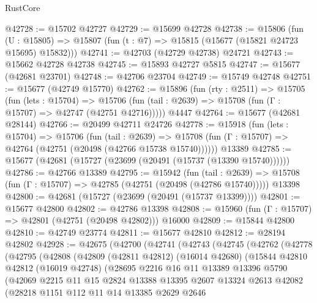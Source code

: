 \begin{lexlean}{RustCore}
\begin{coremodule}
@42728 := @15702 @42727
@42729 := @15699 @42728
@42738 := @15806
    (fun (U : @15805) => @15807 (fun (t : @7) => @15815 (@15677 (@15821 @24723 @15695) @15832)))
@42741 := @42703 (@42729 @42738) @24721
@42743 := @15662 @42728 @42738
@42745 := @15893 @42727 @5815
@42747 := @15677 (@42681 @23701)
@42748 := @42706 @23704
@42749 := @15749 @42748
@42751 := @15677 (@42749 @15770)
@42762 := @15896
    (fun (rty : @2511) =>
    @15705
      (fun (lets : @15704) =>
      @15706 (fun (tail : @2639) => @15708 (fun (Γ : @15707) => @42747 (@42751 @42716)))))
    @4447
@42764 := @15677 (@42681 @28144)
@42766 := @20499 @42711 @24726
@42778 := @15918
    (fun (lets : @15704) =>
    @15706
      (fun (tail : @2639) =>
      @15708 (fun (Γ : @15707) => @42764 (@42751 (@20498 (@42766 @15738 @15740))))))
    @13389
@42785 := @15677 (@42681 (@15727 (@23699 (@20491 (@15737 (@13390 @15740))))))
@42786 := @42766 @13389
@42795 := @15942
    (fun (tail : @2639) => @15708 (fun (Γ : @15707) => @42785 (@42751 (@20498 (@42786 @15740)))))
    @13398
@42800 := @42681 (@15727 (@23699 (@20491 (@15737 @13399))))
@42801 := @15677 @42800
@42802 := @42786 @13398
@42808 := @15960 (fun (Γ : @15707) => @42801 (@42751 (@20498 @42802))) @16000
@42809 := @15844 @42800
@42810 := @42749 @23774
@42811 := @15677 @42810
@42812 := @28194 @42802
@42928 := @42675
    (@42700
      (@42741
        (@42743
          (@42745
            (@42762
              (@42778
                (@42795
                  (@42808
                    (@42809
                      (@42811 @42812)
                      (@16014 @42680)
                      (@15844
                        @42810
                        @42812
                        (@16019 @42748)
                        (@28695
                          @2216
                          @16
                          @11
                          @13389
                          @13396
                          @5790
                          (@42069
                            @2215
                            @11
                            @15
                            @2824
                            @13388
                            @13395
                            @2607
                            @13324
                            @2613
                            @42082
                            (@28218
                              @1151
                              @112
                              @11
                              @14
                              @13385
                              @2629
                              @2646

\end{coremodule}
\end{lexlean}
